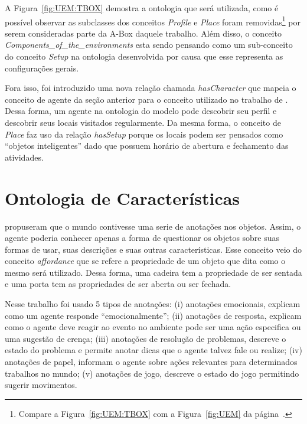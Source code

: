 A Figura~\ref{fig:UEM:TBOX} demostra a ontologia que será utilizada, como é
possível observar as subclasses dos conceitos \emph{Profile} e \emph{Place}
foram removidas\footnote{Compare a Figura~\ref{fig:UEM:TBOX} com a
Figura~\ref{fig:UEM} da página~\pageref{fig:UEM}.} por serem consideradas parte
da A-Box daquele trabalho. Além disso, o conceito
\emph{Components\_of\_the\_environments} esta sendo pensando como um
sub-conceito do conceito \emph{Setup} na ontologia desenvolvida por causa que
esse representa as configurações gerais.

Fora isso, foi introduzido uma nova relação chamada \emph{hasCharacter} que
mapeia o conceito de agente da seção anterior para o conceito utilizado no
trabalho de \citet{paiva2005ontology}. Dessa forma, um agente na ontologia do
modelo \occ pode descobrir seu perfil e descobrir seus locais visitados
regularmente. Da mesma forma, o conceito de \emph{Place} faz uso da relação
\emph{hasSetup} porque os locais podem ser pensados como ``objetos
inteligentes'' dado que possuem horário de abertura e fechamento das
atividades.


\section{Ontologia de Características} \label{cap:tp:odp}

\citet{doyle1998annotated} propuseram que o mundo contivesse uma serie de
anotações nos objetos. Assim, o agente poderia conhecer apenas a forma de
questionar os objetos sobre suas formas de usar, suas descrições e suas outras
características. Esse conceito veio do conceito \emph{affordance} que se
refere a propriedade de um objeto que dita como o mesmo será utilizado.
Dessa forma, uma cadeira tem a propriedade de ser sentada e uma porta tem as
propriedades de ser aberta ou ser fechada.

Nesse trabalho foi usado 5 tipos de anotações: (i) anotações emocionais,
explicam como um agente responde ``emocionalmente''; (ii) anotações de
resposta, explicam como o agente deve reagir ao evento no ambiente pode ser
uma ação especifica ou uma sugestão de crença; (iii) anotações de resolução de
problemas, descreve o estado do problema  e permite anotar dicas que o agente
talvez fale ou realize; (iv) anotações de papel, informam o agente sobre ações
relevantes para determinados trabalhos no mundo; (v) anotações de jogo,
descreve o estado do jogo permitindo sugerir movimentos.

